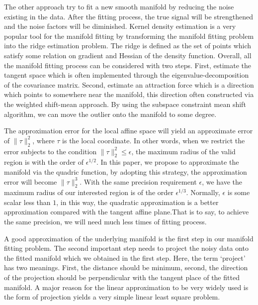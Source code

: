 \documentclass{article}
\theoremstyle{remark}
\begin{document}
 The other approach try to fit a new smooth manifold by reducing the noise existing in the data. After the fitting process, the true signal will be strengthened and the noise factors will be diminished. Kernel density estimation \cite{genovese2014nonparametric,ozertem2011locally} is a very popular tool for the manifold fitting by transforming the manifold fitting problem into the ridge estimation problem. The ridge is defined as the set of points which satisfy some relation on gradient and Hessian of the density function. Overall, all the manifold fitting process can be considered with two steps. First, estimate the tangent space which is often implemented through the eigenvalue-decomposition of the covariance matrix. Second,  estimate an attraction force which is a  direction which points to somewhere near the manifold, this direction often constructed via the weighted shift-mean approach. By using the subspace constraint mean shift algorithm, we can move the outlier onto the manifold to some degree.
 
 The approximation error for the local affine space will yield an approximate error of $\|\tau\|_2^2$, where $\tau$ is the local coordinate. In other words, when we restrict the error subjects to the condition $\|\tau\|_2^2\leq \epsilon$, the maximum radius of the valid region is with the order of $\epsilon^{1/2}$. In this paper, we propose to approximate the manifold via the quadric function, by adopting this strategy, the approximation error will become $\|\tau\|_2^3$.  With the same precision requirement $\epsilon$, we have the maximum radius of our interested region is of the order $\epsilon^{1/3}$. Normally, $\epsilon$ is some scalar less than $1$, in this way, the quadratic approximation is a better approximation compared with the tangent affine plane.That is to say, to achieve the same precision, we will need much less times of fitting process.

A good approximation of the underlying manifold is the first step in our manifold fitting problem. The second important step needs to project the noisy data onto the fitted manifold which we obtained in the first step. Here, the term `project' has two meanings. First, the distance should be minimum, second, the direction of the projection should be perpendicular with the tangent place of the fitted manifold. A major reason for the linear approximation to be very widely used is the form of projection yields a very simple linear least square problem.


\end{document}
